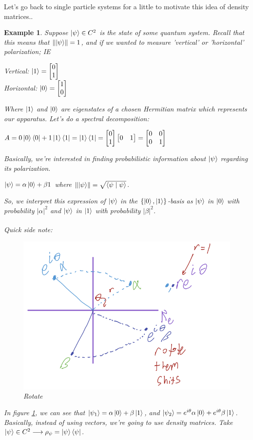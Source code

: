 \documentclass[12pt]{article}
\theoremstyle{plain}
\theoremstyle{nonumberplain}
\theoremstyle{plain}
\newtheorem{example}[lemma]{Example}
\theoremstyle{nonumberplain}
\newcommand\1{{\bf 1}}
\newcommand{\bmat}[1]{\begin{bmatrix*} #1 \end{bmatrix*}} %
\newcommand{\<}{\left\langle}
\renewcommand{\>}{\right\rangle}
\newcommand{\lb}{\left\{}
\newcommand{\rb}{\right\}}
\newcommand{\norm}[1]{\left\lVert#1\right\rVert} %
\newcommand{\inp}[2]{\left\langle#1\mid #2\right\rangle} %
\newcommand{\abs}[1]{\left\lvert #1 \right\rvert} %
\begin{document}
Let's go back to single particle systems for a little to motivate this idea of density matrices..
\begin{example}
Suppose $\ket{\psi}\in C^2$ is the state of some quantum system. Recall that this means that $\norm{\ket{\psi}}=1$, and if we wanted to measure 'vertical' or 'horizontal' polarization; IE \\
\begin{center}
Vertical: $\ket{1}=\bmat{0 \\ 1}$ \\
Horizontal: $\ket{0}=\bmat{1 \\ 0}$
\end{center}
Where $\ket{1}$ and $\ket{0}$ are eigenstates of a chosen Hermitian matrix which represents our apparatus. Let's do a spectral decomposition:
\begin{center}
$A=0\ket{0}\bra{0}+1\ket{1}\bra{1}=\ket{1}\bra{1}=\bmat{0 \\ 1}\bmat{0 & 1}=\bmat{0 & 0 \\ 0 & 1}$
\end{center}
Basically, we're interested in finding probabilistic information about $\ket{\psi}$ regarding its polarization.
\begin{center}
$\ket{\psi}=\alpha\ket{0}+\beta{1}$ where $\norm{\ket{\psi}}=\sqrt{\inp{\psi}{\psi}}$.
\end{center}
So, we interpret this expression of $\ket{\psi}$ in the $\lb\ket{0},\ket{1}\rb$-basis as $\ket{\psi}$ in $\ket{0}$ with probability $\abs{\alpha}^2$ and $\ket{\psi}$ in $\ket{1}$ with probability $\abs{\beta}^2$. \\\\
Quick side note: 
\begin{figure}[h]
  \includegraphics[width=.6\linewidth]{rotation1.jpeg}
  \centering
  \caption{Rotate}
  \label{fig:rotate1}
\end{figure}
In figure \ref{fig:rotate1}, we can see that $\ket{\psi_1}=\alpha\ket{0}+\beta\ket{1}$, and $\ket{\psi_2}=e^{i\theta}\alpha\ket{0}+e^{i\theta}\beta\ket{1}$. Basically, instead of using vectors, we're going to use density matrices. Take $\ket{\psi}\in C^2 \longrightarrow \rho_\psi =\ket{\psi}\bra{\psi}$.

\end{example}
\end{document}
